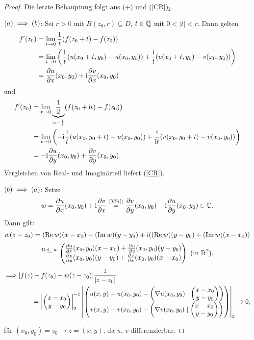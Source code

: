 \documentclass[a4paper,twoside,DIV15,BCOR12mm]{scrbook}
\begin{document}
\begin{proof} Die letzte Behauptung folgt aus (+) und (\ref{CR})$_2$.

\noindent $(a) \implies (b)$: Sei $r > 0$ mit $B(z_0,r) \subseteq D$, $t\in\mathbb{Q}$ mit $0 < |t| < r$. Dann gelten
\begin{align}
f^\prime(z_0) &= \lim_{t\rightarrow 0} \frac{1}{t} (f(z_0+t) - f(z_0))\nonumber\\
&=  \lim_{t\rightarrow 0} \left(\frac{1}{t} (u(x_0+t,y_0)-u(x_0,y_0)) + \frac{\mathrm{i}}{t} (v(x_0+t,y_0)-v(x_0,y_0))\right)\nonumber\\
&=\frac{\partial u}{\partial x} (x_0,y_0) + \mathrm{i}\frac{\partial v}{\partial x} (x_0,y_0)
\end{align} und \begin{align}
f^\prime(z_0) &= \lim_{t\rightarrow 0} \underbrace{\frac{1}{\mathrm{i} t}}_{=-\frac{\mathrm{i}}{t}} (f(z_0+\mathrm{i} t) - f(z_0))\nonumber\\
&=  \lim_{t\rightarrow 0} \left(-\mathrm{i}\frac{1}{t} (u(x_0,y_0+t)-u(x_0,y_0)) + \frac{\mathrm{i}}{\mathrm{i} t} (v(x_0,y_0+t)-v(x_0,y_0))\right)\nonumber\\
&=-\mathrm{i}\frac{\partial u}{\partial y} (x_0,y_0) + \frac{\partial v}{\partial y} (x_0,y_0).
\end{align}
Vergleichen von Real- und Imaginärteil liefert (\ref{CR}).

\noindent $(b) \implies (a)$: Setze
\[w=\frac{\partial u}{\partial x} (x_0,y_0) + \mathrm{i}\frac{\partial v}{\partial x}\stackrel{\text{(\ref{CR})}}{=} \frac{\partial v}{\partial y} (x_0,y_0) - \mathrm{i}\frac{\partial u}{\partial y}(x_0,y_0) \in\mathbb{C}.\]
Dann gilt:
\[w(z-z_0) = (\operatorname{Re}{w})(x-x_0) - (\operatorname{Im}{w})(y-y_0) + \mathrm{i}((\operatorname{Re}{w})(y-y_0) + (\operatorname{Im}{w})(x-x_0))\]
\[\stackrel{\text{Def. $w$}}{=} \cmplx{\frac{\partial u}{\partial x} (x_0,y_0)(x-x_0) + \frac{\partial u}{\partial y}(x_0,y_0)(y-y_0)}{\frac{\partial v}{\partial y} (x_0,y_0)(y-y_0) + \frac{\partial v}{\partial x}(x_0,y_0)(x-x_0)}\ \text{(in $\R^2$)}.\]
\begin{align*}
\displaystyle\folgt &|f(z)-f(z_0)-w(z-z_0)|\frac{1}{|z-z_0|}\\
&\qquad= \left|\cmplx{x-x_0}{y-y_0}\right|_2^{-1} \left|\cmplx{u(x,y)-u(x_0,y_0)-\left(\nabla u(x_0,y_0)\mid\cmplx{x-x_0}{y-y_0}\right)}{v(x,y)-v(x_0,y_0)-\left(\nabla v(x_0,y_0)\mid\cmplx{x-x_0}{y-y_0}\right)}\right|_2 \ra 0,
\end{align*}

für $(x_0,y_0)=z_0 \to z=(x,y)$,
da $u$, $v$ differenzierbar.
\end{proof}
\end{document}
